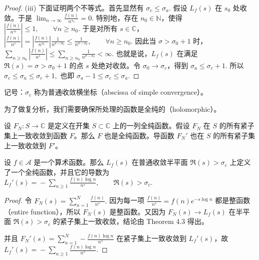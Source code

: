 \begin{proof}
	(iii) 下面证明两个不等式。首先显然有
	\(\textstyle \sigma_c\leq\allowbreak{}\sigma_a.\)
	假设 $L_f(s)$ 在 $s_0$ 处收敛。于是
	\(\textstyle \lim_{n\to\allowbreak{}\infty}\frac{f(n)}{n^{s_0}}=\allowbreak{}0.\)
	特别地，存在 $n_0\in\mathbb N$，使得
	\(\textstyle \left|\frac{f(n)}{n^{s_0}}\right|\leq\allowbreak{} 1,\allowbreak{} \qquad \forall n\geq\allowbreak{} n_0.\)
	于是对所有 $s\in\mathbb C$，
	\(\textstyle \left|\frac{f(n)}{n^s}\right| =\allowbreak{} \left|\frac{f(n)}{n^{s_0}}\right| \frac1{n^{\sigma-\sigma_0}} \leq\allowbreak{} \frac1{n^{\sigma-\sigma_0}},\allowbreak{} \qquad \forall n\geq\allowbreak{} n_0.\)
	因此当 $\sigma>\sigma_0+1$ 时，
	\(\textstyle \sum_{n\geq\allowbreak{} n_0}\left|\frac{f(n)}{n^s}\right| \leq\allowbreak{} \sum_{n\geq\allowbreak{} n_0}\frac1{n^{\sigma-\sigma_0}} <\infty.\)
	也就是说，$L_f(s)$ 在满足 $\Re(s)=\sigma>\sigma_0+1$ 的点 $s$ 处绝对收敛。令 $\sigma_0\to\sigma_c$，得到
	\(\textstyle \sigma_a\leq\allowbreak{}\sigma_c+\allowbreak{}1.\)
	所以
	\(\textstyle \sigma_c\leq\allowbreak{}\sigma_a\leq\allowbreak{}\sigma_c+\allowbreak{}1,\allowbreak{}\)
	也即
	\(\textstyle \sigma_a-1\leq\allowbreak{}\sigma_c\leq\allowbreak{}\sigma_a.\)
\end{proof}

记号：$\sigma_c$ 称为普通收敛横坐标（abscissa of simple convergence）。


为了做复分析，我们需要确保所处理的函数是全纯的（holomorphic）。

\begin{theorem}[原文 Theorem 4.3]
	设 $F_N:S\to\mathbb C$ 是定义在开集 $S\subset\mathbb C$ 上的一列全纯函数。假设 $F_N$ 在 $S$ 的所有紧子集上一致收敛到函数 $F$。那么 $F$ 也是全纯函数。导函数 $F_N'$ 也在 $S$ 的所有紧子集上一致收敛到 $F'$。
\end{theorem}

\begin{theorem}
	设 $f\in\mathcal A$ 是一个算术函数。那么 $L_f(s)$ 在普通收敛半平面 $\Re(s)>\sigma_c$ 上定义了一个全纯函数，并且它的导数为
	\(\textstyle L_f'(s)=\allowbreak{}-\sum_{n\geq\allowbreak{} 1}\frac{f(n)\log n}{n^s},\allowbreak{} \qquad \Re(s)>\sigma_c.\)
\end{theorem}

\begin{proof}
	令
	\(\textstyle F_N(s)=\allowbreak{}\sum_{n=\allowbreak{}1}^N\frac{f(n)}{n^s}.\)
	因为每一项
	\(\textstyle \frac{f(n)}{n^s}=\allowbreak{}f(n)e^{-s\log n}\)
	都是整函数（entire function），所以 $F_N(s)$ 是整函数。又因为 $F_N(s)\to L_f(s)$ 在半平面 $\Re(s)>\sigma_c$ 的紧子集上一致收敛，结论由 Theorem 4.3 得出。

	并且
	\(\textstyle F_N'(s)=\allowbreak{}\sum_{n=\allowbreak{}1}^N-\frac{f(n)\log n}{n^s}\)
	在紧子集上一致收敛到 $L_f'(s)$，故
	\(\textstyle L_f'(s)=\allowbreak{}-\sum_{n\geq\allowbreak{} 1}\frac{f(n)\log n}{n^s}.\)
\end{proof}

